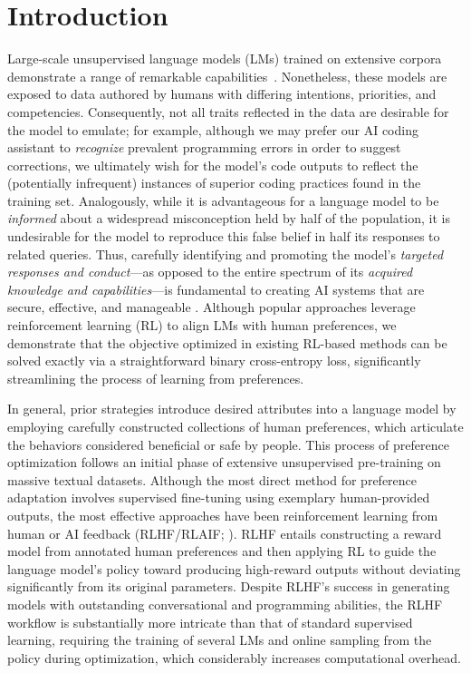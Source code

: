 \section{Introduction}
Large-scale unsupervised language models (LMs) trained on extensive corpora demonstrate a range of remarkable capabilities~\citep{chowdhery2022palm, brown2020language, touvron2023llama,bubeck2023sparks}. Nonetheless, these models are exposed to data authored by humans with differing intentions, priorities, and competencies. Consequently, not all traits reflected in the data are desirable for the model to emulate; for example, although we may prefer our AI coding assistant to \textit{recognize} prevalent programming errors in order to suggest corrections, we ultimately wish for the model's code outputs to reflect the (potentially infrequent) instances of superior coding practices found in the training set. Analogously, while it is advantageous for a language model to be \textit{informed} about a widespread misconception held by half of the population, it is undesirable for the model to reproduce this false belief in half its responses to related queries. Thus, carefully identifying and promoting the model’s \emph{targeted responses and conduct}—as opposed to the entire spectrum of its \textit{acquired knowledge and capabilities}—is fundamental to creating AI systems that are secure, effective, and manageable \citep{ouyang2022training}. Although popular approaches leverage reinforcement learning (RL) to align LMs with human preferences, we demonstrate that the objective optimized in existing RL-based methods can be solved exactly via a straightforward binary cross-entropy loss, significantly streamlining the process of learning from preferences.

In general, prior strategies introduce desired attributes into a language model by employing carefully constructed collections of human preferences, which articulate the behaviors considered beneficial or safe by people. This process of preference optimization follows an initial phase of extensive unsupervised pre-training on massive textual datasets. Although the most direct method for preference adaptation involves supervised fine-tuning using exemplary human-provided outputs, the most effective approaches have been reinforcement learning from human or AI feedback (RLHF/RLAIF; \citep{christiano2017deep,bai2022constitutional}). RLHF entails constructing a reward model from annotated human preferences and then applying RL to guide the language model's policy toward producing high-reward outputs without deviating significantly from its original parameters. Despite RLHF’s success in generating models with outstanding conversational and programming abilities, the RLHF workflow is substantially more intricate than that of standard supervised learning, requiring the training of several LMs and online sampling from the policy during optimization, which considerably increases computational overhead.

